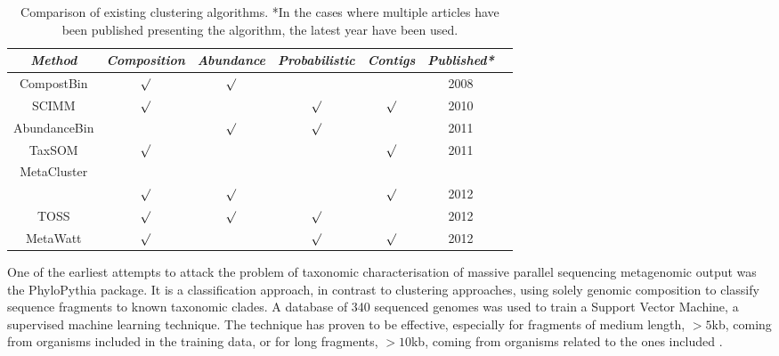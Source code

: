 \begin{table}[ht!]
  \centering
  \footnotesize
  \begin{tabular}{|c|c|c|c|c|c|c|}
    \hline
    \emph{Method} & \emph{Composition} & \emph{Abundance} & \emph{Probabilistic} & \emph{Contigs} & \emph{Published*}\\
    \hline
    CompostBin \parencite{Chatterji2008}& $\surd$  & $\surd$ & & & 2008 \\
    \hline
    SCIMM \parencite{Kelley2010} & $\surd$ & &$\surd$ &$\surd$ & 2010\\
    \hline
    AbundanceBin \parencite{Wu2011b} & & $\surd$ & $\surd$ & & 2011\\
    \hline
    TaxSOM \parencite{Weber2011} & $\surd$ & & & $\surd$ & 2011\\
    \hline
    MetaCluster & & & & & \\
\parencite{Yang2010, Yang2010c, Leung2011, Wang2012, Wang2012h} & $\surd$ & $\surd$ & &$\surd$ & 2012\\
    \hline
    TOSS \parencite{Tanaseichuk2012, Tanaseichuk2012a} & $\surd$ & $\surd$ & $\surd$ & & 2012\\
    \hline
    MetaWatt \parencite{Strous2012a} & $\surd$ & &$\surd$ & $\surd$ & 2012\\
    \hline
  \end{tabular}
  \caption{Comparison of existing clustering algorithms. *In the cases where multiple articles have been published presenting the algorithm, the latest year have been used.}
\end{table}
One of the earliest attempts to attack the problem of taxonomic characterisation of massive parallel sequencing metagenomic output was the PhyloPythia package. It is a classification approach, in contrast to clustering approaches, using solely genomic composition to classify sequence fragments to known taxonomic clades. A database of 340 sequenced genomes was used to train a Support Vector Machine, a supervised machine learning technique. The technique has proven to be effective, especially for fragments of medium length, $>5$kb, coming from organisms included in the training data, or for long fragments, $>10$kb, coming from organisms related to the ones included \parencite{Mchardy2007}.

